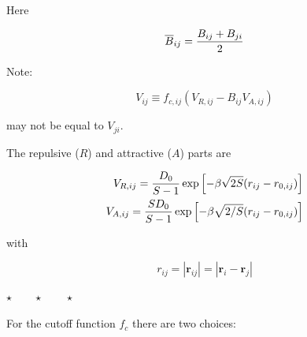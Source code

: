 \documentclass[a4paper,12pt,pdftex,onecolumn]{article}
\newcommand{\stars}{\begin{center}%
\vspace{1em plus 0.5em minus 0.5em}%
$\star \qquad \star \qquad \star$%
\vspace{1em plus 0.5em minus 0.5em}%
\end{center}}
\begin{document}
Here

\begin{equation}
\overline{B}_{ij} = {B_{ij} + B_{ji} \over 2}
\end{equation}

Note:

\begin{equation}
V_{ij} \equiv  f_{c,ij} \left( V_{R,ij} - B_{ij} V_{A,ij} \right)
\end{equation}

may not be equal to $V_{ji}$.

The repulsive ($R$) and attractive ($A$) parts are

\begin{eqnarray}
  V_{R,ij} = {D_0 \over S-1} \exp\left[ - \beta \sqrt{2S} (r_{ij} -r_{0,ij})
  \right] \\
  V_{A,ij} = {S D_0 \over S-1} \exp\left[ - \beta \sqrt{2/S} (r_{ij} -r_{0,ij})
  \right]
\end{eqnarray}

with

\begin{equation}
r_{ij} = |\mathbf{r}_{ij}| = | \mathbf{r}_i - \mathbf{r}_j |
\end{equation}

\stars

For the cutoff function $f_c$ there are two choices:
\end{document}
